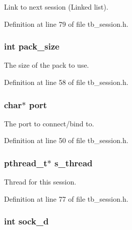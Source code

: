 Link to next session (Linked list). 



Definition at line 79 of file tb\-\_\-session.\-h.

\hypertarget{structtb__session__t_af7112fe07fe05134febc994e10196ce5}{
\subsubsection[{pack\-\_\-size}]{\setlength{\rightskip}{0pt plus 5cm}int pack\-\_\-size}}\label{structtb__session__t_af7112fe07fe05134febc994e10196ce5}


The size of the pack to use. 



Definition at line 58 of file tb\-\_\-session.\-h.

\hypertarget{structtb__session__t_add99ba4ea70b8f66170823cad9a55fa4}{
\subsubsection[{port}]{\setlength{\rightskip}{0pt plus 5cm}char$\ast$ port}}\label{structtb__session__t_add99ba4ea70b8f66170823cad9a55fa4}


The port to connect/bind to. 



Definition at line 50 of file tb\-\_\-session.\-h.

\hypertarget{structtb__session__t_ae0b73c023bde38042a32ba345baca741}{
\subsubsection[{s\-\_\-thread}]{\setlength{\rightskip}{0pt plus 5cm}pthread\-\_\-t$\ast$ s\-\_\-thread}}\label{structtb__session__t_ae0b73c023bde38042a32ba345baca741}


Thread for this session. 



Definition at line 77 of file tb\-\_\-session.\-h.

\hypertarget{structtb__session__t_a94d540b145f21be2f9b28a2c225ccf30}{
\subsubsection[{sock\-\_\-d}]{\setlength{\rightskip}{0pt plus 5cm}int sock\-\_\-d}}\label{structtb__session__t_a94d540b145f21be2f9b28a2c225ccf30}


